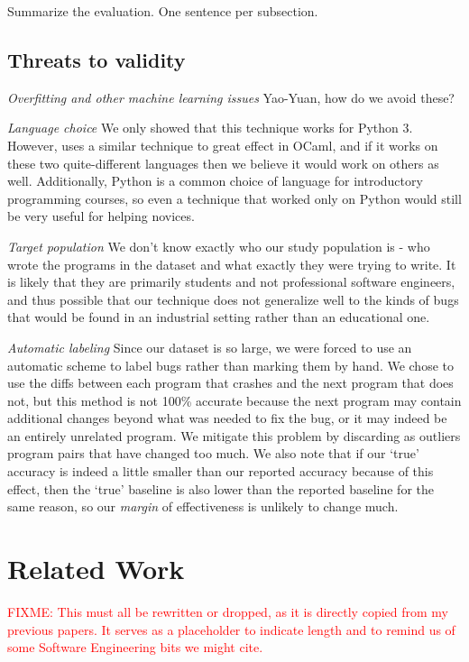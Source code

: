 \documentclass[conference]{IEEEtran}
\newcommand{\fixme}[1]{\textcolor{red}{FIXME: #1}}
\begin{document}
Summarize the evaluation. One sentence per subsection.

\subsection{Threats to validity}
\label{sec-threats}

\emph{Overfitting and other machine learning issues} Yao-Yuan, how do we avoid
these?

\emph{Language choice} We only showed that this technique works for Python 3.
However, \cite{learning-to-blame} uses a similar technique to great effect in
OCaml, and if it works on these two quite-different languages then we believe
it would work on others as well. Additionally, Python is a common choice of
language for introductory programming courses, so even a technique that worked
only on Python would still be very useful for helping novices.

\emph{Target population} We don't know exactly who our study population is -
who wrote the programs in the dataset and what exactly they were trying to write.
It is likely that they are primarily students and not professional software engineers,
and thus possible that our technique does not generalize well to the kinds of
bugs that would be found in an industrial setting rather than an educational one.

\emph{Automatic labeling} Since our dataset is so large, we were forced to use an automatic
scheme to label bugs rather than marking them by hand. We chose to use the diffs
between each program that crashes and the next program that does not, but this method
is not 100\% accurate because the next program may contain additional changes
beyond what was needed to fix the bug, or it may indeed be an entirely unrelated
program. We mitigate this problem by discarding as outliers program pairs that have
changed too much. We also note that if our `true' accuracy is indeed a little
smaller than our reported accuracy because of this effect, then the `true' baseline
is also lower than the reported baseline for the same reason, so our
\emph{margin} of effectiveness is unlikely to change much.

\section{Related Work}
\fixme{This must all be rewritten or dropped, as it is directly copied from
my previous papers. It serves as a placeholder to indicate length and to
remind us of some Software Engineering bits we might cite.}
\end{document}
